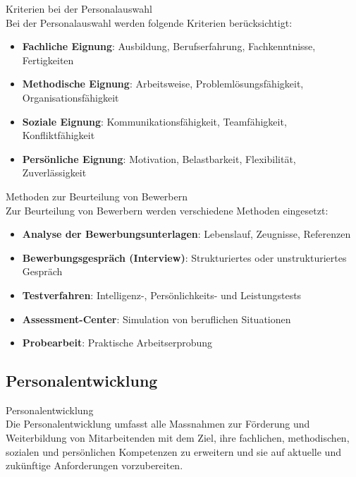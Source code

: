 \begin{definition}{Kriterien bei der Personalauswahl}\\
Bei der Personalauswahl werden folgende Kriterien berücksichtigt:
\begin{itemize}
    \item \textbf{Fachliche Eignung}: Ausbildung, Berufserfahrung, Fachkenntnisse, Fertigkeiten
    \item \textbf{Methodische Eignung}: Arbeitsweise, Problemlösungsfähigkeit, Organisationsfähigkeit
    \item \textbf{Soziale Eignung}: Kommunikationsfähigkeit, Teamfähigkeit, Konfliktfähigkeit
    \item \textbf{Persönliche Eignung}: Motivation, Belastbarkeit, Flexibilität, Zuverlässigkeit
\end{itemize}
\end{definition}

\begin{definition}{Methoden zur Beurteilung von Bewerbern}\\
Zur Beurteilung von Bewerbern werden verschiedene Methoden eingesetzt:
\begin{itemize}
    \item \textbf{Analyse der Bewerbungsunterlagen}: Lebenslauf, Zeugnisse, Referenzen
    \item \textbf{Bewerbungsgespräch (Interview)}: Strukturiertes oder unstrukturiertes Gespräch
    \item \textbf{Testverfahren}: Intelligenz-, Persönlichkeits- und Leistungstests
    \item \textbf{Assessment-Center}: Simulation von beruflichen Situationen
    \item \textbf{Probearbeit}: Praktische Arbeitserprobung
\end{itemize}
\end{definition}

\subsection{Personalentwicklung}

\begin{definition}{Personalentwicklung}\\
Die Personalentwicklung umfasst alle Massnahmen zur Förderung und Weiterbildung von Mitarbeitenden mit dem Ziel, ihre fachlichen, methodischen, sozialen und persönlichen Kompetenzen zu erweitern und sie auf aktuelle und zukünftige Anforderungen vorzubereiten.
\end{definition}

